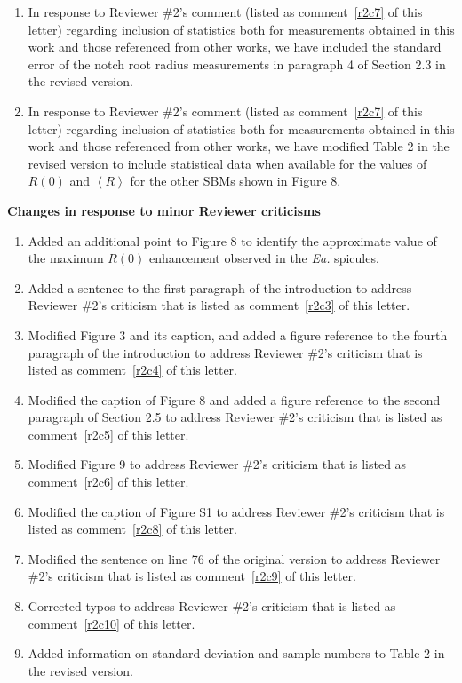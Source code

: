 \documentclass[11pt,letterpaper]{report}
\makeatletter
\newcommand{\EA}{\textit{Ea.\@}\xspace}
\makeatother
\begin{document}
\begin{enumerate}[label=\textit{Mc.\arabic*}]
%
\item \label{Mc3} In response to Reviewer \#2's comment (listed as comment~\ref{r2c7} of this letter) regarding inclusion of statistics both for measurements obtained in this work and those referenced from other works, we have included the standard error of the notch root radius measurements in paragraph 4 of Section 2.3 in the revised version.
%
\item \label{Mc4} In response to Reviewer \#2's comment (listed as comment~\ref{r2c7} of this letter) regarding inclusion of statistics both for measurements obtained in this work and those referenced from other works, we have modified Table 2 in the revised version to include statistical data when available for the values of $R(0)$ and $\left< R\right>$ for the other SBMs shown in Figure 8.
%
\end{enumerate}

{\bf Changes in response to minor Reviewer criticisms}
\begin{enumerate}[label=\textit{mc.\arabic*}]
%
\item \label{mc08} Added an additional point to Figure 8 to identify the approximate value of the maximum $R(0)$ enhancement observed in the \EA spicules.
%
\item  \label{mc1} Added a sentence to the first paragraph of the introduction to address Reviewer \#2's criticism that is listed as comment~\ref{r2c3} of this letter.
%
\item  \label{mc2} Modified Figure 3 and its caption, and added a figure reference to the fourth paragraph of the introduction to address Reviewer \#2's criticism that is listed as comment~\ref{r2c4} of this letter.
%
\item  \label{mc3} Modified the caption of Figure 8 and added a figure reference to the second paragraph of Section 2.5 to address Reviewer \#2's criticism that is listed as comment~\ref{r2c5} of this letter.
%
\item  \label{mc4} Modified Figure 9 to address Reviewer \#2's criticism that is listed as comment~\ref{r2c6} of this letter.
%
\item  \label{mc5} Modified the caption of Figure S1 to address Reviewer \#2's criticism that is listed as comment~\ref{r2c8} of this letter.
%
\item  \label{mc6} Modified the sentence on line 76 of the original version to address Reviewer \#2's criticism that is listed as comment~\ref{r2c9} of this letter.
%
\item  \label{mc7} Corrected typos to address Reviewer \#2's criticism that is listed as comment~\ref{r2c10} of this letter.
%
\item  \label{mc8} Added information on standard deviation and sample numbers to Table 2 in the revised version.
%
\end{enumerate}
\end{document}
